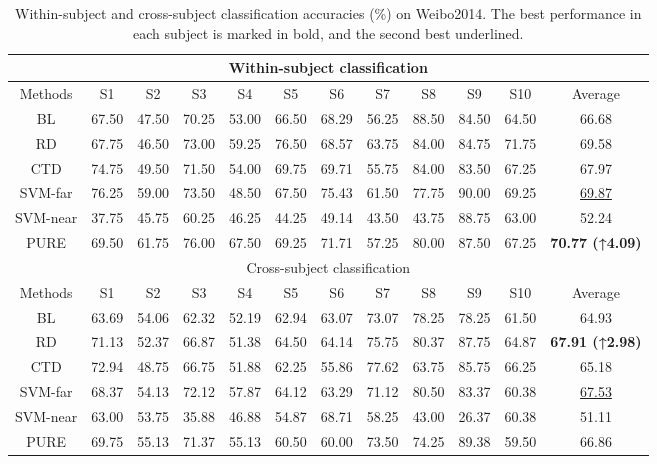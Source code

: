 \documentclass[journal,twocolumn]{IEEEtran}
\begin{document}
\begin{table}[htpb]
  \centering
  \caption{Within-subject and cross-subject classification accuracies (\%) on Weibo2014. The best performance in each subject is marked in bold, and the second best underlined.}
  \label{tab:weibo2014-result}
  \begin{tabular}{c|c|c|c|c|c|c|c|c|c|c|c}
  \toprule
  \multicolumn{12}{c}{Within-subject classification} \\
  \midrule
  Methods & S1 & S2 & S3 & S4 & S5 & S6 & S7 & S8 & S9 & S10 & Average \\
  \midrule
  BL & 67.50 & 47.50 & 70.25 & 53.00 & 66.50 & 68.29 & 56.25 & 88.50 & 84.50 & 64.50 & 66.68 \\
  RD & 67.75 & 46.50 & 73.00 & 59.25 & 76.50 & 68.57 & 63.75 & 84.00 & 84.75 & 71.75 & 69.58 \\
  CTD & 74.75 & 49.50 & 71.50 & 54.00 & 69.75 & 69.71 & 55.75 & 84.00 & 83.50 & 67.25 & 67.97 \\
  SVM-far & 76.25 & 59.00 & 73.50 & 48.50 & 67.50 & 75.43 & 61.50 & 77.75 & 90.00 & 69.25 & \underline{69.87} \\
  SVM-near & 37.75 & 45.75 & 60.25 & 46.25 & 44.25 & 49.14 & 43.50 & 43.75 & 88.75 & 63.00 & 52.24 \\
  PURE & 69.50 & 61.75 & 76.00 & 67.50 & 69.25 & 71.71 & 57.25 & 80.00 & 87.50 & 67.25 & \textbf{70.77 (↑4.09)} \\
  \midrule
  \multicolumn{12}{c}{Cross-subject classification} \\
  \midrule
  Methods & S1 & S2 & S3 & S4 & S5 & S6 & S7 & S8 & S9 & S10 & Average \\
  \midrule
  BL & 63.69 & 54.06 & 62.32 & 52.19 & 62.94 & 63.07 & 73.07 & 78.25 & 78.25 & 61.50 & 64.93 \\
  RD & 71.13 & 52.37 & 66.87 & 51.38 & 64.50 & 64.14 & 75.75 & 80.37 & 87.75 & 64.87 & \textbf{67.91 (↑2.98)} \\
  CTD & 72.94 & 48.75 & 66.75 & 51.88 & 62.25 & 55.86 & 77.62 & 63.75 & 85.75 & 66.25 & 65.18 \\
  SVM-far & 68.37 & 54.13 & 72.12 & 57.87 & 64.12 & 63.29 & 71.12 & 80.50 & 83.37 & 60.38 & \underline{67.53} \\
  SVM-near & 63.00 & 53.75 & 35.88 & 46.88 & 54.87 & 68.71 & 58.25 & 43.00 & 26.37 & 60.38 & 51.11 \\
  PURE & 69.75 & 55.13 & 71.37 & 55.13 & 60.50 & 60.00 & 73.50 & 74.25 & 89.38 & 59.50 & 66.86 \\
  \bottomrule
  \end{tabular}
\end{table}
  
\end{document}
